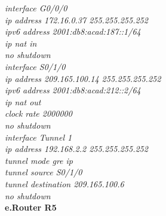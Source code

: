 \documentclass[12pt,a4paper]{report}
\begin{document}
\hspace*{2cm}\textit{interface G0/0/0\\
\hspace*{2cm}ip address 172.16.0.37 255.255.255.252\\
\hspace*{2cm}ipv6 address 2001:db8:acad:187::1/64\\
\hspace*{2cm}ip nat in\\
\hspace*{2cm}no shutdown\\
\hspace*{2cm}interface S0/1/0\\
\hspace*{2cm}ip address 209.165.100.14 255.255.255.252\\
\hspace*{2cm}ipv6 address 2001:db8:acad:212::2/64\\
\hspace*{2cm}ip nat out\\
\hspace*{2cm}clock rate 2000000\\
\hspace*{2cm}no shutdown\\
\hspace*{2cm}interface Tunnel 1\\
\hspace*{2cm}ip address 192.168.2.2 255.255.255.252\\
\hspace*{2cm}tunnel mode gre ip\\
\hspace*{2cm}tunnel source S0/1/0\\
\hspace*{2cm}tunnel destination 209.165.100.6\\
\hspace*{2cm}no shutdown\\}
\hspace*{1cm}\textbf{e.Router R5} \\
\end{document}
